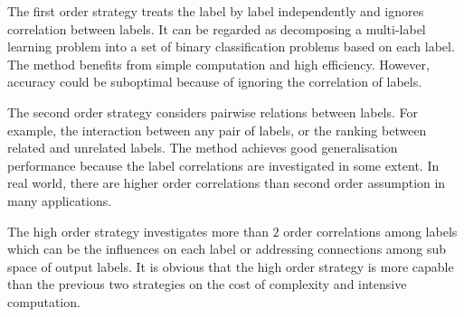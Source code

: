 The first order strategy treats the label by label independently and ignores correlation between labels. It can be regarded as decomposing a multi-label learning problem into a set of binary classification problems based on each label. The method benefits from simple computation and high efficiency. However, accuracy could be suboptimal because of ignoring the correlation of labels.

The second order strategy considers pairwise relations between labels. For example, the interaction between any pair of labels, or the ranking between related and unrelated labels. The method achieves good generalisation performance because the label correlations are investigated in some extent. In real world, there are higher order correlations than second order assumption in many applications.

The high order strategy investigates more than $2$ order correlations among labels which can be the influences on each label or addressing connections among sub space of output labels. It is obvious that the high order strategy is more capable than the previous two strategies on the cost of complexity and intensive computation.
